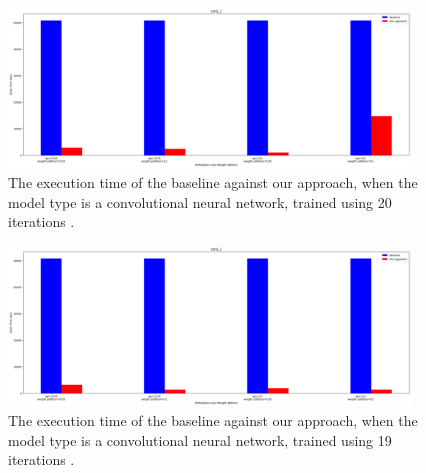 \begin{figure}[ht]
  \centering
  \includegraphics[width=0.95\textwidth]{cnn0_1.png}
  \caption{The execution time of the baseline against our approach, when the model type is a convolutional neural network, trained using 20 iterations .}
  \label{fig:cnn0_1}
\end{figure}

\begin{figure}[ht]
  \centering
  \includegraphics[width=0.95\textwidth]{cnn0_2.png}
  \caption{The execution time of the baseline against our approach, when the model type is a convolutional neural network, trained using 19 iterations .}
  \label{fig:cnn0_2}
\end{figure}

\begin{table}[H]
	\centering
\caption{The lower and upper bounds for 3X10 architecture 
		\label{table_3_x_10}}
\end{table}


